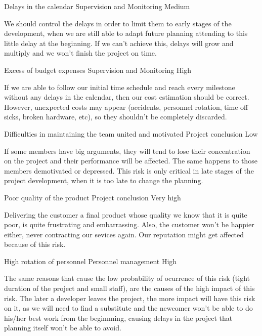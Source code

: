\begin{risk}[riskDelays]{Delays in the calendar}
\riskcat Supervision and Monitoring
 Medium

We should control the delays in order to limit them to early stages of the development, when we are still able to adapt future planning attending to this little delay at the beginning. If we can't achieve this, delays will grow and multiply and we won't finish the project on time.
\end{risk}

\begin{risk}[riskBudget]{Excess of budget expenses}
\riskcat Supervision and Monitoring
 High

If we are able to follow our initial time schedule and reach every milestone without any delays in the calendar, then our cost estimation should be correct. However, unexpected costs may appear (accidents, personnel rotation, time off sicks, broken hardware, etc), so they shouldn't be completely discarded.
\end{risk}

\begin{risk}[riskMotivation]{Difficulties in maintaining the team united and motivated}
\riskcat Project conclusion
 Low

If some members have big arguments, they will tend to lose their concentration on the project and their performance will be affected. The same happens to those members demotivated or depressed. This risk is only critical in late stages of the project development, when it is too late to change the planning.
\end{risk}

\begin{risk}[riskQuality]{Poor quality of the product}
\riskcat Project conclusion
 Very high

Delivering the customer a final product whose quality we know that it is quite poor, is quite frustrating and embarrassing. Also, the customer won't be happier either, never contracting our sevices again. Our reputation might get affected because of this risk.
\end{risk}

\begin{risk}[riskPersonnelRotation]{High rotation of personnel}
\riskcat Personnel management
 High

The same reasons that cause the low probability of ocurrence of this risk (tight duration of the project and small staff), are the causes of the high impact of this risk. The later a developer leaves the project, the more impact will have this risk on it, as we will need to find a substitute and the newcomer won't be able to do his/her best work from the beginnning, causing delays in the project that planning itself won't be able to avoid.
\end{risk}

